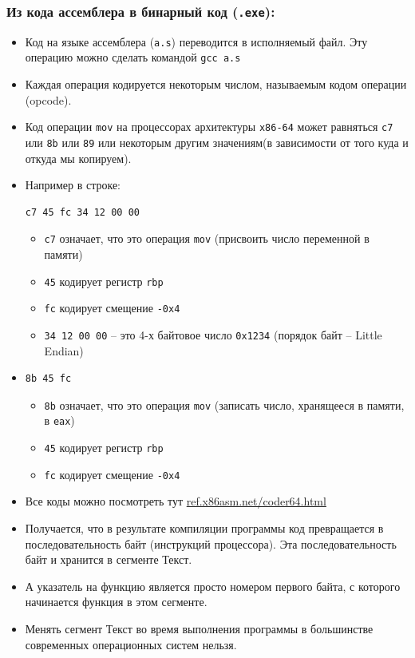 \documentclass[10pt]{article}
\begin{document}
\subsubsection*{Из кода ассемблера в бинарный код (\texttt{.exe}):}
\begin{itemize}
\item Код на языке ассемблера (\texttt{a.s}) переводится в исполняемый файл. Эту операцию можно сделать командой \texttt{gcc a.s}
\item Каждая операция кодируется некоторым числом, называемым кодом операции (opcode).
\item Код операции \texttt{mov} на процессорах архитектуры \texttt{x86-64} может равняться \texttt{с7} или \texttt{8b} или \texttt{89} или некоторым другим  значениям(в зависимости от того куда и откуда мы копируем).
\item Например в строке:
\begin{verbatim}
c7 45 fc 34 12 00 00
\end{verbatim}
\begin{itemize}
\item \texttt{с7} означает, что это операция \texttt{mov} (присвоить число переменной в памяти)
\item \texttt{45} кодирует регистр \texttt{rbp}
\item \texttt{fc} кодирует смещение \texttt{-0x4}
\item \texttt{34 12 00 00} -- это 4-х байтовое число \texttt{0x1234} (порядок байт -- Little Endian)
\end{itemize}

\item
\begin{verbatim}
8b 45 fc
\end{verbatim}
\begin{itemize}
\item \texttt{8b} означает, что это операция \texttt{mov} (записать число, хранящееся в памяти, в \texttt{eax})
\item \texttt{45} кодирует регистр \texttt{rbp}
\item \texttt{fc} кодирует смещение \texttt{-0x4}
\end{itemize}

\item Все коды можно посмотреть тут \href{http://ref.x86asm.net/coder64.html}{ref.x86asm.net/coder64.html}
\item Получается, что в результате компиляции программы код превращается в последовательность байт (инструкций процессора). Эта последовательность байт и хранится в сегменте Текст.
\item А указатель на функцию является просто номером первого байта, с которого начинается функция в этом сегменте.
\item Менять сегмент Текст во время выполнения программы в большинстве современных операционных систем нельзя. 
\end{itemize}
\end{document}
